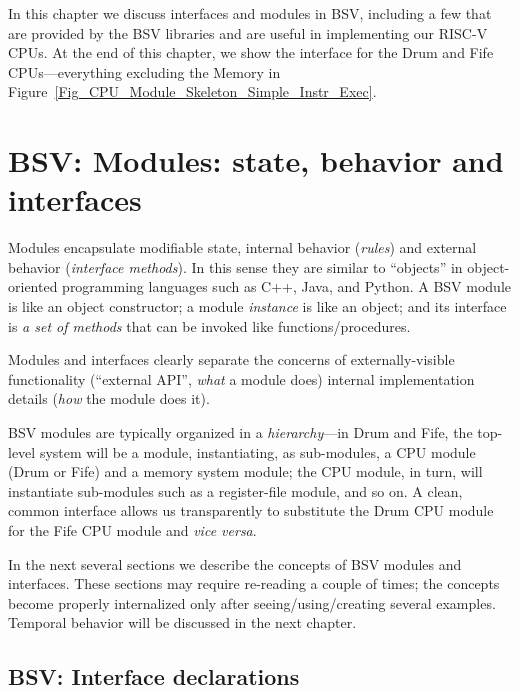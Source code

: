 In this chapter we discuss interfaces and modules in BSV, including a
few that are provided by the BSV libraries and are useful in
implementing our RISC-V CPUs.  At the end of this chapter, we show the
interface for the Drum and Fife CPUs---everything excluding the
Memory in Figure~\ref{Fig_CPU_Module_Skeleton_Simple_Instr_Exec}.


\section{BSV: Modules: state, behavior and interfaces}

\label{Sec_CPU_Module_Skeleton_Modules}


Modules encapsulate modifiable state, internal behavior (\emph{rules})
and external behavior (\emph{interface methods}).  In this sense they
are similar to ``objects'' in object-oriented programming languages
such as C++, Java, and Python.  A BSV module is like an object
constructor; a module \emph{instance} is like an object; and its
interface is \emph{a set of methods} that can be invoked like
functions/procedures.

Modules and interfaces clearly separate the concerns of
externally-visible functionality (``external API'', \emph{what} a
module does) {\vs} internal implementation details (\emph{how} the
module does it).

BSV modules are typically organized in a \emph{hierarchy}---in
Drum and Fife, the top-level system will be a module,
instantiating, as sub-modules, a CPU module (Drum or Fife) and a
memory system module; the CPU module, in turn, will instantiate
sub-modules such as a register-file module, and so on.  A clean,
common interface allows us transparently to substitute the Drum
CPU module for the Fife CPU module and \emph{vice versa}.

In the next several sections we describe the concepts of BSV modules
and interfaces.  These sections may require re-reading a couple of
times; the concepts become properly internalized only after
seeing/using/creating several examples.  Temporal behavior will be
discussed in the next chapter.


\subsection{BSV: Interface declarations}

